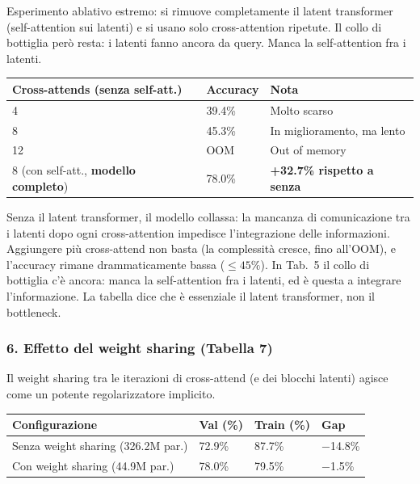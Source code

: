 \documentclass[
  11pt,
]{article}
\begin{document}
Esperimento ablativo estremo: si rimuove completamente il latent transformer (self-attention sui latenti) e si usano solo cross-attention ripetute. Il collo di bottiglia però resta: i latenti fanno ancora da query. Manca la self-attention fra i latenti.

{\small
\begin{longtable}{@{}p{5cm} p{2.8cm} p{4cm}@{}}
\toprule
\textbf{Cross-attends (senza self-att.)} & \textbf{Accuracy} & \textbf{Nota} \\
\midrule
\endhead
4  & 39.4\% & Molto scarso \\[2pt]
8  & 45.3\% & In miglioramento, ma lento \\[2pt]
12 & OOM    & Out of memory \\[2pt]
\midrule
8 (con self-att., \textbf{modello completo}) & 78.0\% & \textbf{+32.7\% rispetto a senza} \\[2pt]
\bottomrule
\end{longtable}
}

\begin{notabox}[title={\textbf{Il latent transformer è essenziale}}]
Senza il latent transformer, il modello collassa: la mancanza di comunicazione tra i latenti dopo ogni cross-attention impedisce l'integrazione delle informazioni. Aggiungere più cross-attend non basta (la complessità cresce, fino all'OOM), e l'accuracy rimane drammaticamente bassa ($\le 45\%$). In Tab.~5 il collo di bottiglia c'è ancora: manca la self-attention fra i latenti, ed è questa a integrare l'informazione. La tabella dice che è essenziale il latent transformer, non il bottleneck.
\end{notabox}

\subsubsection*{6. Effetto del weight sharing (Tabella 7)}

Il weight sharing tra le iterazioni di cross-attend (e dei blocchi latenti) agisce come un potente regolarizzatore implicito.

{\small
\begin{longtable}{@{}p{5.5cm} p{2.5cm} p{2.5cm} p{2cm}@{}}
\toprule
\textbf{Configurazione} & \textbf{Val (\%)} & \textbf{Train (\%)} & \textbf{Gap} \\
\midrule
\endhead
Senza weight sharing (326.2M par.) & 72.9\% & 87.7\% & $-$14.8\% \\[2pt]
Con weight sharing (44.9M par.)    & 78.0\% & 79.5\% & $-$1.5\% \\[2pt]
\bottomrule
\end{longtable}
}
\end{document}

